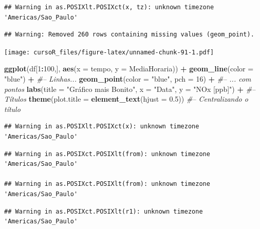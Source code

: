 \documentclass[]{book}
\newenvironment{Shaded}{\begin{snugshade}}{\end{snugshade}}
\newcommand{\KeywordTok}[1]{\textcolor[rgb]{0.13,0.29,0.53}{\textbf{#1}}}
\newcommand{\DataTypeTok}[1]{\textcolor[rgb]{0.13,0.29,0.53}{#1}}
\newcommand{\DecValTok}[1]{\textcolor[rgb]{0.00,0.00,0.81}{#1}}
\newcommand{\FloatTok}[1]{\textcolor[rgb]{0.00,0.00,0.81}{#1}}
\newcommand{\StringTok}[1]{\textcolor[rgb]{0.31,0.60,0.02}{#1}}
\newcommand{\CommentTok}[1]{\textcolor[rgb]{0.56,0.35,0.01}{\textit{#1}}}
\newcommand{\OperatorTok}[1]{\textcolor[rgb]{0.81,0.36,0.00}{\textbf{#1}}}
\newcommand{\NormalTok}[1]{#1}
\theoremstyle{definition}
\theoremstyle{definition}
\theoremstyle{definition}
\theoremstyle{remark}
\begin{document}
\begin{verbatim}
## Warning in as.POSIXlt.POSIXct(x, tz): unknown timezone 'Americas/Sao_Paulo'
\end{verbatim}

\begin{verbatim}
## Warning: Removed 260 rows containing missing values (geom_point).
\end{verbatim}

\texttt{[image: cursoR\_files/figure-latex/unnamed-chunk-91-1.pdf]}

\begin{Shaded}
\begin{Highlighting}[]
\KeywordTok{ggplot}\NormalTok{(df[}\DecValTok{1}\OperatorTok{:}\DecValTok{100}\NormalTok{,], }\KeywordTok{aes}\NormalTok{(}\DataTypeTok{x =}\NormalTok{ tempo, }\DataTypeTok{y =}\NormalTok{ MediaHoraria)) }\OperatorTok{+}\StringTok{ }
\StringTok{  }\KeywordTok{geom_line}\NormalTok{(}\DataTypeTok{color =} \StringTok{"blue"}\NormalTok{) }\OperatorTok{+}\StringTok{ }\CommentTok{#-- Linhas...}
\StringTok{  }\KeywordTok{geom_point}\NormalTok{(}\DataTypeTok{color =} \StringTok{"blue"}\NormalTok{, }\DataTypeTok{pch =} \DecValTok{16}\NormalTok{) }\OperatorTok{+}\StringTok{ }\CommentTok{#-- ... com pontos}
\StringTok{  }\KeywordTok{labs}\NormalTok{(}\DataTypeTok{title =} \StringTok{"Gráfico mais Bonito"}\NormalTok{, }\DataTypeTok{x =} \StringTok{"Data"}\NormalTok{, }\DataTypeTok{y =} \StringTok{"NOx [ppb]"}\NormalTok{) }\OperatorTok{+}\StringTok{ }\CommentTok{#-- Títulos}
\StringTok{  }\KeywordTok{theme}\NormalTok{(}\DataTypeTok{plot.title =} \KeywordTok{element_text}\NormalTok{(}\DataTypeTok{hjust =} \FloatTok{0.5}\NormalTok{)) }\CommentTok{#-- Centralizando o título}
\end{Highlighting}
\end{Shaded}

\begin{verbatim}
## Warning in as.POSIXlt.POSIXct(x): unknown timezone 'Americas/Sao_Paulo'
\end{verbatim}

\begin{verbatim}
## Warning in as.POSIXct.POSIXlt(from): unknown timezone 'Americas/Sao_Paulo'

## Warning in as.POSIXct.POSIXlt(from): unknown timezone 'Americas/Sao_Paulo'
\end{verbatim}

\begin{verbatim}
## Warning in as.POSIXct.POSIXlt(r1): unknown timezone 'Americas/Sao_Paulo'
\end{verbatim}
\end{document}
